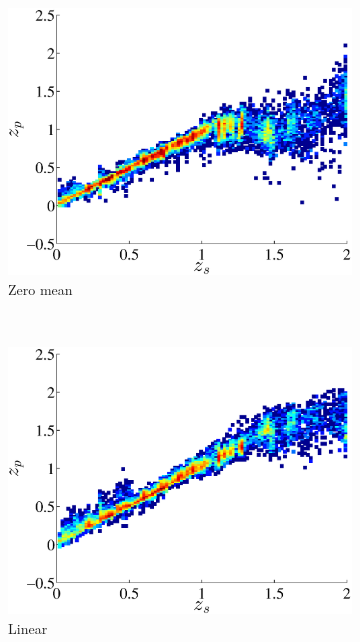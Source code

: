 \documentclass[useAMS,usenatbib,fleqn]{mn2e}
\begin{document}
\begin{figure}
       \begin{subfigure}[b]{0.3\textwidth}
                \includegraphics[width=\textwidth]{figures/22_0.eps}
                \caption{Zero mean}
        \end{subfigure}
        ~
        \begin{subfigure}[b]{0.3\textwidth}
                \includegraphics[width=\textwidth]{figures/22_L.eps}
                \caption{Linear}
        \end{subfigure}
        ~
        \begin{subfigure}[b]{0.3\textwidth}

\end{subfigure}
\end{figure}
\end{document}
